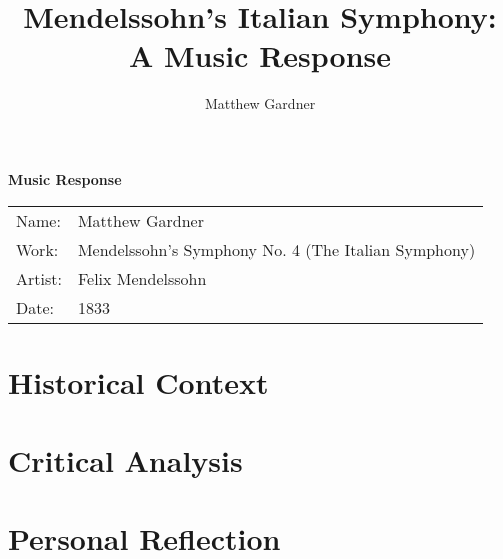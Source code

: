 \documentclass[onecolumn, 12pt]{article}
\title{Mendelssohn's Italian Symphony: A Music Response}
\author{Matthew Gardner}
\date{}
\begin{document}
\textbf{Music Response}

\begin{tabular}{ll}
  Name:&Matthew Gardner \\
  Work:&Mendelssohn's Symphony No. 4 (The Italian Symphony) \\
  Artist:&Felix Mendelssohn \\
  Date:&1833 \\
\end{tabular}


\section*{Historical Context}

\section*{Critical Analysis}

\section*{Personal Reflection}
\end{document}
